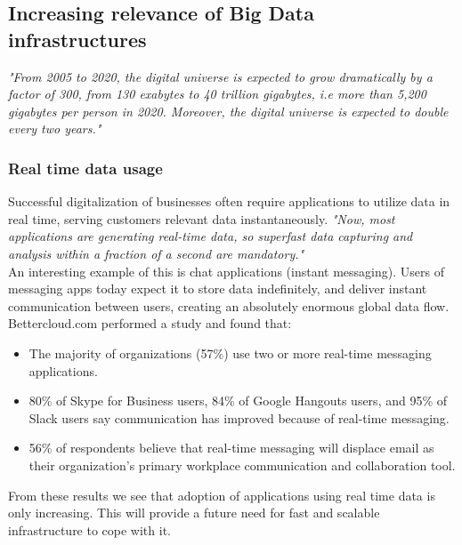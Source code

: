 \documentclass[a4paper,english]{report}
\begin{document}
			\subsection{Increasing relevance of Big Data infrastructures}
			\label{big_data}
			\textit{"From 2005 to 2020, the digital universe is expected to grow dramatically by a factor of 300, from 130 exabytes to 40 trillion gigabytes, i.e more than 5,200 gigabytes per person in 2020. Moreover, the digital universe is expected to double every two years."}\cite{bigdata}
				\subsubsection{Real time data usage}
				Successful digitalization of businesses often require applications to utilize data in real time, serving customers relevant data instantaneously. \textit{"Now, most applications are generating real-time data, so superfast data capturing and analysis within a fraction of a second are mandatory."}\cite{management_analytics}
				\\
				An interesting example of this is chat applications (instant messaging). Users of messaging apps today expect it to store data indefinitely, and deliver instant communication between users, creating an absolutely enormous global data flow. Bettercloud.com performed a study and found that\cite{bettercloud}:
				\begin{itemize}
					\item The majority of organizations (57\%) use two or more real-time messaging applications.
					\item 80\% of Skype for Business users, 84\% of Google Hangouts users, and 95\% of Slack users say communication has improved because of real-time messaging.
					\item 56\% of respondents believe that real-time messaging will displace email as their organization’s primary workplace communication and collaboration tool.
				\end{itemize}
				From these results we see that adoption of applications using real time data is only increasing. This will provide a future need for fast and scalable infrastructure to cope with it. 
\end{document}
